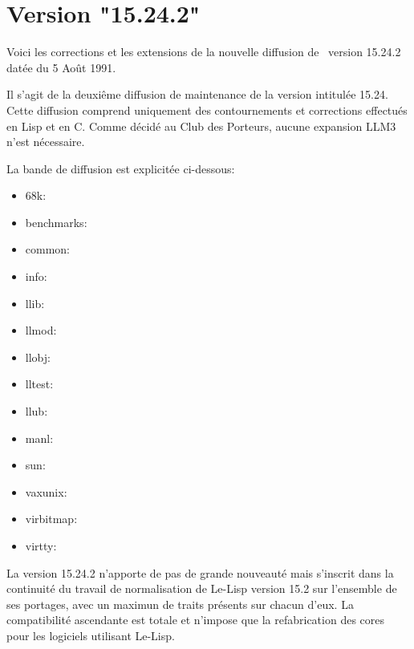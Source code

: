 

\Begin
{}
\bigskip
{}


                 
                            
\chapter {Version "15.24.2"}
Voici les corrections et les extensions de la nouvelle diffusion de
\LeLisp\ version 15.24.2 dat\'{e}e du 5 Ao\^{u}t 1991.

Il s'agit de la deuxi\^{e}me diffusion de maintenance de la version
intitul\'{e}e 15.24.  Cette diffusion comprend uniquement des 
contournements et corrections effectu\'{e}s en Lisp et en C.  
Comme d\'{e}cid\'{e} au Club des Porteurs, aucune expansion LLM3 n'est n\'{e}cessaire.



La bande de diffusion est explicit\'{e}e ci-dessous:

\begin {itemize}
\item   68k:
\item   benchmarks:
\item   common: 
\item   info:
\item   llib:           
\item   llmod:
\item   llobj:
\item   lltest:         
\item   llub:   
\item   manl:
\item   sun:
\item   vaxunix:
\item   virbitmap:
\item   virtty: 
\end {itemize}



La version 15.24.2 n'apporte de pas de grande nouveaut\'{e} mais
s'inscrit dans la continuit\'{e} du travail de normalisation de Le-Lisp
version 15.2 sur l'ensemble de ses portages, avec un maximun de traits
pr\'{e}sents sur chacun d'eux. La compatibilit\'{e} ascendante est totale et
n'impose que la refabrication des cores pour les logiciels utilisant
Le-Lisp.

